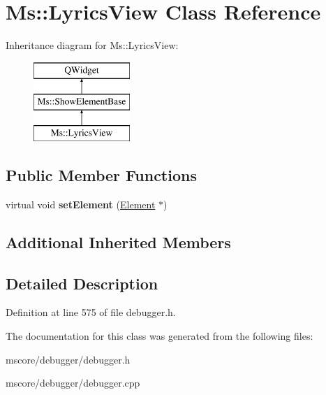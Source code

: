 \hypertarget{class_ms_1_1_lyrics_view}{}\section{Ms\+:\+:Lyrics\+View Class Reference}
\label{class_ms_1_1_lyrics_view}
Inheritance diagram for Ms\+:\+:Lyrics\+View\+:\begin{figure}[H]
\begin{center}
\leavevmode
\includegraphics[height=3.000000cm]{class_ms_1_1_lyrics_view}
\end{center}
\end{figure}
\subsection*{Public Member Functions}
\begin{DoxyCompactItemize}
\item 
\mbox{\label{class_ms_1_1_lyrics_view_a1da3f1c2ac184a54aaf85812db769c16}} 
virtual void {\bfseries set\+Element} (\hyperlink{class_ms_1_1_element}{Element} $\ast$)
\end{DoxyCompactItemize}
\subsection*{Additional Inherited Members}


\subsection{Detailed Description}


Definition at line 575 of file debugger.\+h.



The documentation for this class was generated from the following files\+:\begin{DoxyCompactItemize}
\item 
mscore/debugger/debugger.\+h\item 
mscore/debugger/debugger.\+cpp\end{DoxyCompactItemize}
